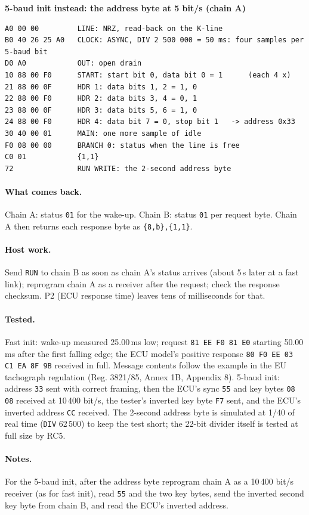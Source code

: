\documentclass[11pt,a4paper]{article}
\newcommand{\sig}[1]{\texttt{#1}}
\newcommand{\progtitle}[1]{\par\smallskip\textbf{\small\color{accent}#1}\par\nopagebreak}
\begin{document}
\progtitle{5-baud init instead: the address byte at 5 bit/s (chain A)}
\begin{lstlisting}
A0 00 00         LINE: NRZ, read-back on the K-line
B0 40 26 25 A0   CLOCK: ASYNC, DIV 2 500 000 = 50 ms: four samples per 5-baud bit
D0 A0            OUT: open drain
10 88 00 F0      START: start bit 0, data bit 0 = 1      (each 4 x)
21 88 00 0F      HDR 1: data bits 1, 2 = 1, 0
22 88 00 F0      HDR 2: data bits 3, 4 = 0, 1
23 88 00 0F      HDR 3: data bits 5, 6 = 1, 0
24 88 00 F0      HDR 4: data bit 7 = 0, stop bit 1   -> address 0x33
30 40 00 01      MAIN: one more sample of idle
F0 08 00 00      BRANCH 0: status when the line is free
C0 01            {1,1}
72               RUN WRITE: the 2-second address byte
\end{lstlisting}
\paragraph{What comes back.} Chain A: status \texttt{01} for the wake-up. Chain B: status \texttt{01} per request byte. Chain A then returns each response byte as \texttt{\{8,b\},\{1,1\}}.

\paragraph{Host work.} Send \sig{RUN} to chain B as soon as chain A's status arrives (about 5\,\textmu s later at a fast link); reprogram chain A as a receiver after the request; check the response checksum. P2 (ECU response time) leaves tens of milliseconds for that.

\paragraph{Tested.} Fast init: wake-up measured 25.00\,ms low; request \texttt{81 EE F0 81 E0} starting 50.00\,ms after the first falling edge; the ECU model's positive response \texttt{80 F0 EE 03 C1 EA 8F 9B} received in full. Message contents follow the example in the EU tachograph regulation (Reg. 3821/85, Annex 1B, Appendix 8). 5-baud init: address \texttt{33} sent with correct framing, then the ECU's sync \texttt{55} and key bytes \texttt{08 08} received at 10\,400 bit/s, the tester's inverted key byte \texttt{F7} sent, and the ECU's inverted address \texttt{CC} received. The 2-second address byte is simulated at 1/40 of real time (\sig{DIV} 62\,500) to keep the test short; the 22-bit divider itself is tested at full size by RC5.
\paragraph{Notes.} For the 5-baud init, after the address byte reprogram chain A as a 10\,400 bit/s receiver (as for fast init), read \texttt{55} and the two key bytes, send the inverted second key byte from chain B, and read the ECU's inverted address.
\end{document}
